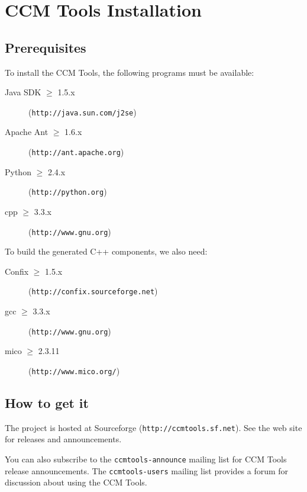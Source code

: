 \chapter{CCM Tools Installation}


\section{Prerequisites}

To install the CCM Tools, the following programs must be available:
\begin{description}
\item [Java SDK $\ge$ 1.5.x] ({\tt http://java.sun.com/j2se})
\item [Apache Ant $\ge$ 1.6.x] ({\tt http://ant.apache.org})
\item [Python $\ge$ 2.4.x] ({\tt http://python.org})
\item [cpp $\ge$ 3.3.x] ({\tt http://www.gnu.org})
\end{description}

To build the generated C++ components, we also need:
\begin{description}
\item [Confix $\ge$ 1.5.x] ({\tt http://confix.sourceforge.net})
\item [gcc $\ge$ 3.3.x] ({\tt http://www.gnu.org})
\item [mico $\ge$ 2.3.11] ({\tt http://www.mico.org/})
\end{description}


\section{How to get it}

The project is hosted at Sourceforge ({\tt http://ccmtools.sf.net}). See the web
site for releases and announcements.

You can also subscribe to the {\tt ccmtools-announce} mailing list for CCM Tools
release announcements. The {\tt ccmtools-users} mailing list provides a forum
for discussion about using the CCM Tools.


